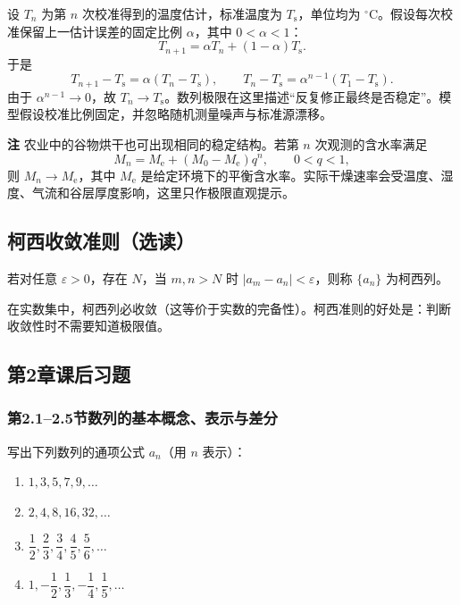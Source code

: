 \documentclass[fontset=fandol]{ctexart}
\newenvironment{extra}{\begin{mdframed}[style=extrastyle, frametitle={* 选读内容（不要求掌握）}]}{\end{mdframed}}
\newenvironment{remark}{\par\noindent\textbf{注}\quad}{\par\vspace{0.8em}}
\begin{document}
\begin{application}[工程：温度传感器的迭代校准]
设 $T_n$ 为第 $n$ 次校准得到的温度估计，标准温度为 $T_{\mathrm s}$，单位均为 $^\circ\mathrm C$。假设每次校准保留上一估计误差的固定比例 $\alpha$，其中 $0<\alpha<1$：
\[
T_{n+1}=\alpha T_n+(1-\alpha)T_{\mathrm s}.
\]
于是
\[
T_{n+1}-T_{\mathrm s}=\alpha(T_n-T_{\mathrm s}),
\qquad
T_n-T_{\mathrm s}=\alpha^{n-1}(T_1-T_{\mathrm s}).
\]
由于 $\alpha^{n-1}\to0$，故 $T_n\to T_{\mathrm s}$。数列极限在这里描述“反复修正最终是否稳定”。模型假设校准比例固定，并忽略随机测量噪声与标准源漂移。
\end{application}

\begin{remark}
农业中的谷物烘干也可出现相同的稳定结构。若第 $n$ 次观测的含水率满足
\[
M_n=M_{\mathrm e}+(M_0-M_{\mathrm e})q^n,\qquad0<q<1,
\]
则 $M_n\to M_{\mathrm e}$，其中 $M_{\mathrm e}$ 是给定环境下的平衡含水率。实际干燥速率会受温度、湿度、气流和谷层厚度影响，这里只作极限直观提示。
\end{remark}
\fi


\begin{extra}
\subsection*{柯西收敛准则（选读）}

\begin{definition}[柯西列]
若对任意 \(\varepsilon > 0\)，存在 \(N\)，当 \(m,n > N\) 时 \(|a_m - a_n| < \varepsilon\)，则称 \(\{a_n\}\) 为柯西列。
\end{definition}
在实数集中，柯西列必收敛（这等价于实数的完备性）。柯西准则的好处是：判断收敛性时不需要知道极限值。
\end{extra}


\iffalse


\subsection*{第2章课后习题}

\subsubsection*{第2.1--2.5节\quad 数列的基本概念、表示与差分}

\begin{exercise}写出下列数列的通项公式 \(a_n\)（用 \(n\) 表示）：
\begin{enumerate}
\item \(1, 3, 5, 7, 9, \dots\)
\item \(2, 4, 8, 16, 32, \dots\)
\item \(\dfrac{1}{2}, \dfrac{2}{3}, \dfrac{3}{4}, \dfrac{4}{5}, \dfrac{5}{6}, \dots\)
\item \(1, -\dfrac{1}{2}, \dfrac{1}{3}, -\dfrac{1}{4}, \dfrac{1}{5}, \dots\)
\end{enumerate}
\end{exercise}
\end{document}
